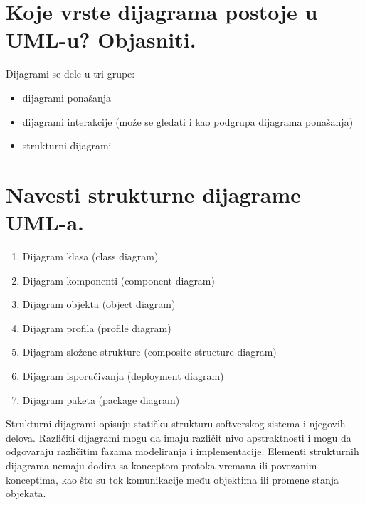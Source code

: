 \documentclass[a4paper]{article}
\begin{document}
\section{Koje vrste dijagrama postoje u UML-u? Objasniti.}
  \noindent Dijagrami se dele u tri grupe:
  \begin{itemize}
    \item dijagrami ponašanja
    \item dijagrami interakcije (može se gledati i kao podgrupa dijagrama ponašanja)
    \item strukturni dijagrami
  \end{itemize}

\section{Navesti strukturne dijagrame UML-a.}
  \begin{enumerate}
    \item Dijagram klasa (class diagram)
    \item Dijagram komponenti (component diagram)
    \item Dijagram objekta (object diagram)
    \item Dijagram profila (profile diagram)
    \item Dijagram složene strukture (composite structure diagram)
    \item Dijagram isporučivanja (deployment diagram)
    \item Dijagram paketa (package diagram)
  \end{enumerate}

  Strukturni dijagrami opisuju statičku strukturu softverskog sistema i njegovih delova.
  Različiti dijagrami mogu da imaju različit nivo apstraktnosti i mogu da odgovaraju
  različitim fazama modeliranja i implementacije. Elementi strukturnih dijagrama nemaju
  dodira sa konceptom protoka vremana ili povezanim
  konceptima, kao što su tok komunikacije među objektima ili promene stanja objekata.
\end{document}
